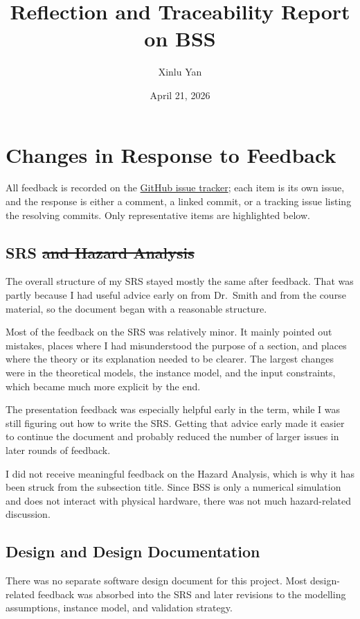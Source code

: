 \documentclass{article}
\title{Reflection and Traceability Report on BSS}
\author{Xinlu Yan}
\date{April 21, 2026}
\begin{document}
\maketitle

\section{Changes in Response to Feedback}

All feedback is recorded on the
\href{https://github.com/Xinlu-Y/CAS741/issues}{GitHub issue tracker}; each
item is its own issue, and the response is either a comment, a linked
commit, or a tracking issue listing the resolving commits. Only
representative items are highlighted below.

\subsection{SRS \sout{and Hazard Analysis}}

The overall structure of my SRS stayed mostly the same after feedback.
That was partly because I had useful advice early on from Dr.~Smith and
from the course material, so the document began with a reasonable
structure.

Most of the feedback on the SRS was relatively minor. It mainly pointed
out mistakes, places where I had misunderstood the purpose of a section,
and places where the theory or its explanation needed to be clearer. The
largest changes were in the theoretical models, the instance model, and
the input constraints, which became much more explicit by the end.

The presentation feedback was especially helpful early in the term,
while I was still figuring out how to write the SRS. Getting that advice
early made it easier to continue the document and probably reduced the
number of larger issues in later rounds of feedback.

I did not receive meaningful feedback on the Hazard Analysis, which is
why it has been struck from the subsection title. Since BSS is only a
numerical simulation and does not interact with physical hardware, there
was not much hazard-related discussion.

\subsection{Design and Design Documentation}

There was no separate software design document for this project. Most
design-related feedback was absorbed into the SRS and later revisions to
the modelling assumptions, instance model, and validation strategy.
\end{document}
